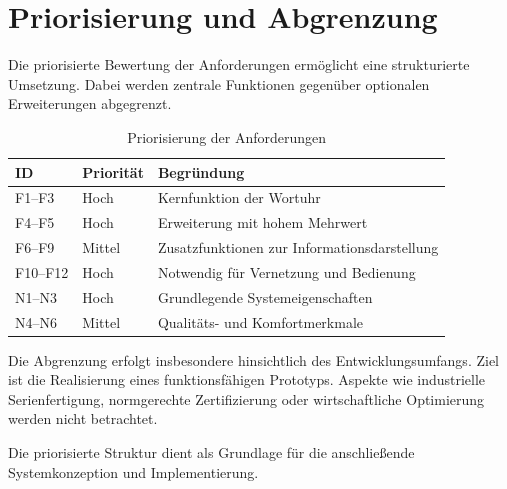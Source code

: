 \section{Priorisierung und Abgrenzung}
Die priorisierte Bewertung der Anforderungen ermöglicht eine strukturierte Umsetzung.
Dabei werden zentrale Funktionen gegenüber optionalen Erweiterungen abgegrenzt.

\begin{table}[H]
\centering
\begin{tabular}{p{3cm} p{3cm} p{6cm}}
\textbf{ID} & \textbf{Priorität} & \textbf{Begründung} \\
\hline
F1–F3 & Hoch & Kernfunktion der Wortuhr \\
F4–F5 & Hoch & Erweiterung mit hohem Mehrwert \\
F6–F9 & Mittel & Zusatzfunktionen zur Informationsdarstellung \\
F10–F12 & Hoch & Notwendig für Vernetzung und Bedienung \\
N1–N3 & Hoch & Grundlegende Systemeigenschaften \\
N4–N6 & Mittel & Qualitäts- und Komfortmerkmale \\
\end{tabular}
\caption{Priorisierung der Anforderungen}
\end{table}

Die Abgrenzung erfolgt insbesondere hinsichtlich des Entwicklungsumfangs.
Ziel ist die Realisierung eines funktionsfähigen Prototyps.
Aspekte wie industrielle Serienfertigung, normgerechte Zertifizierung oder wirtschaftliche Optimierung werden nicht betrachtet.

Die priorisierte Struktur dient als Grundlage für die anschließende Systemkonzeption und Implementierung.
